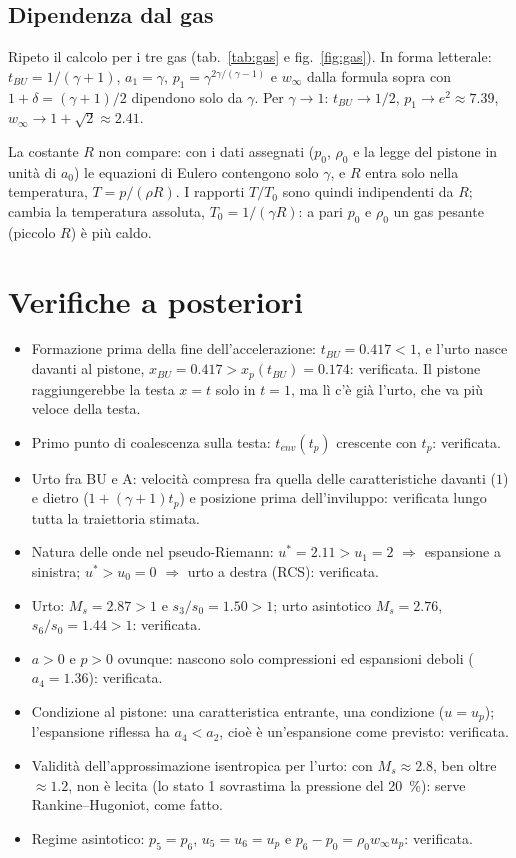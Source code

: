 \documentclass[11pt,a4paper]{article}
\newcommand{\Ms}{M_{s}}
\begin{document}
\subsection*{Dipendenza dal gas}
Ripeto il calcolo per i tre gas (tab.~\ref{tab:gas} e fig.~\ref{fig:gas}). In forma letterale: $t_{BU}=1/(\gamma+1)$,
$a_1=\gamma$, $p_1=\gamma^{2\gamma/(\gamma-1)}$ e $w_\infty$ dalla formula sopra con $1+\delta=(\gamma+1)/2$
dipendono solo da $\gamma$. Per $\gamma\to1$: $t_{BU}\to1/2$, $p_1\to e^2\approx\num{7.39}$,
$w_\infty\to1+\sqrt2\approx\num{2.41}$.

La costante $R$ non compare: con i dati assegnati ($p_0$, $\rho_0$ e la legge del pistone in unità di $a_0$) le
equazioni di Eulero contengono solo $\gamma$, e $R$ entra solo nella temperatura, $T=p/(\rho R)$. I rapporti
$T/T_0$ sono quindi indipendenti da $R$; cambia la temperatura assoluta, $T_0=1/(\gamma R)$: a pari $p_0$ e
$\rho_0$ un gas pesante (piccolo $R$) è più caldo.

\section{Verifiche a posteriori}
\begin{itemize}
\item Formazione prima della fine dell'accelerazione: $t_{BU}=\num{0.417}<1$, e l'urto nasce davanti al pistone,
  $x_{BU}=\num{0.417}>x_p(t_{BU})=\num{0.174}$: verificata. Il pistone raggiungerebbe la testa $x=t$ solo in $t=1$,
  ma lì c'è già l'urto, che va più veloce della testa.
\item Primo punto di coalescenza sulla testa: $t_{env}(t_p)$ crescente con $t_p$: verificata.
\item Urto fra BU e A: velocità compresa fra quella delle caratteristiche davanti ($1$) e dietro
  ($1+(\gamma+1)t_p$) e posizione prima dell'inviluppo: verificata lungo tutta la traiettoria stimata.
\item Natura delle onde nel pseudo-Riemann: $u^*=\num{2.11}>u_1=2$ $\Rightarrow$ espansione a sinistra;
  $u^*>u_0=0$ $\Rightarrow$ urto a destra (RCS): verificata.
\item Urto: $\Ms=\num{2.87}>1$ e $s_3/s_0=\num{1.50}>1$; urto asintotico $\Ms=\num{2.76}$, $s_6/s_0=\num{1.44}>1$:
  verificata.
\item $a>0$ e $p>0$ ovunque: nascono solo compressioni ed espansioni deboli ($a_4=\num{1.36}$): verificata.
\item Condizione al pistone: una caratteristica entrante, una condizione ($u=u_p$); l'espansione riflessa ha
  $a_4<a_2$, cioè è un'espansione come previsto: verificata.
\item Validità dell'approssimazione isentropica per l'urto: con $\Ms\approx\num{2.8}$, ben oltre $\approx\num{1.2}$,
  non è lecita (lo stato 1 sovrastima la pressione del \SI{20}{\percent}): serve Rankine--Hugoniot, come fatto.
\item Regime asintotico: $p_5=p_6$, $u_5=u_6=u_p$ e $p_6-p_0=\rho_0w_\infty u_p$: verificata.
\end{itemize}
\end{document}
